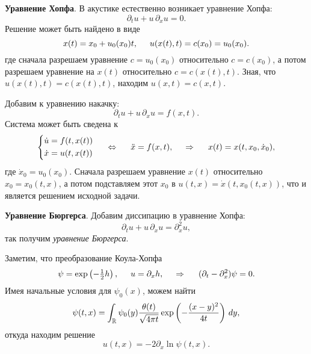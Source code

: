

\textbf{Уравнение Хопфа}.
В акустике естественно возникает уравнение Хопфа:
\begin{equation*}
    \partial_t u + u\, \partial_x u = 0.
\end{equation*}
Решение может быть найдено в виде
\begin{equation*}
    x(t) = x_0 + u_0 (x_0) t, \hspace{5 mm} 
    u(x(t), t) = c(x_0) = u_0 (x_0).
\end{equation*}
где сначала разрешаем уравнение $c = u_0 (x_0)$ относительно $c = c(x_0)$, а потом разрешаем уравнение на $x(t)$ относительно $c = c(x(t), t)$. 
Зная, что $u(x(t), t) = c(x(t), t)$, находим $u(x, t) = c(x, t)$. 

 Добавим к уравнению накачку:
\begin{equation*}
    \partial_t u + u\, \partial_x u = f(x, t).
\end{equation*}
Система может быть сведена к
\begin{equation*}
    \left\{\begin{aligned}
        \dot{u} &= f(t, x(t)) \\
        \dot{x} &= u(t, x(t))
    \end{aligned}\right.
    \hspace{5 mm} \Leftrightarrow \hspace{5 mm} 
    \ddot{x} = f(x, t),
    \hspace{0.5cm} \Rightarrow \hspace{0.5cm}
    x(t) = x(t, x_0, \dot{x}_0),
\end{equation*}
где $\dot{x}_0 = u_0(x_0)$. Сначала разрешаем уравнение $x(t)$ относительно $x_0 = x_0(t, x)$, а потом подставляем этот $x_0$ в $u(t, x) = \dot{x}(t, x_0(t,x))$, что и является решением исходной задачи.



\textbf{Уравнение Бюргерса}.
Добавим диссипацию в уравнение Хопфа:
\begin{equation*}
    \partial_t u + u\, \partial_x u = \partial_x^2 u,
\end{equation*}
так получим \textit{уравнение Бюргерса}.

Заметим, что преобразование Коула-Хопфа
\begin{equation*}
    \psi = \exp\left(- \tfrac{1}{2}h\right),
    \hspace{5 mm} 
    u = \partial_x h,
    \hspace{0.5cm} \Rightarrow \hspace{0.5cm}
    (\partial_t - \partial_x^2)\psi = 0.
\end{equation*}
Имея начальные условия для $\psi_0(x)$, можем найти
\begin{equation*}
    \psi(t, x) = \int_{\mathbb{R}} \psi_0 (y) \frac{\theta(t)}{\sqrt{4 \pi t}} \exp\left(-\frac{(x-y)^2}{4t}\right) \, d y,
\end{equation*}
откуда находим решение
\begin{equation*}
    u(t, x) =  -2 \partial_x \ln \psi(t, x).
\end{equation*}
